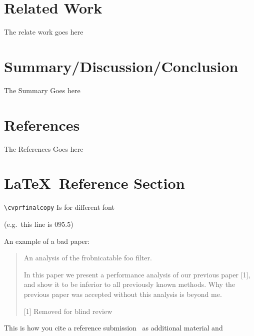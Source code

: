 \documentclass[10pt,twocolumn,letterpaper]{article}
\begin{document}
\section{Related Work}
The relate work goes here

\section{Summary/Discussion/Conclusion}
The Summary Goes here

\section{References}
The References Goes here









\section{\LaTeX\ Reference Section}
\verb'\cvprfinalcopy' Is for different font

(e.g.\ this line is $095.5$)

An example of a bad paper:
\begin{quote}
\begin{center}
    An analysis of the frobnicatable foo filter.
\end{center}

   In this paper we present a performance analysis of our
   previous paper [1], and show it to be inferior to all
   previously known methods.  Why the previous paper was
   accepted without this analysis is beyond me.

   [1] Removed for blind review
\end{quote}

This is how you cite a reference submission~\cite{Authors06} as additional material and
\end{document}
